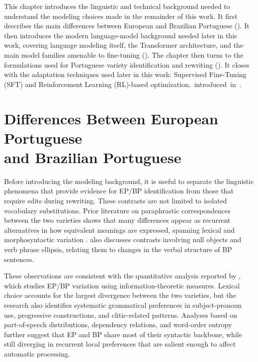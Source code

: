 \label{chap:back}

This chapter introduces the linguistic and technical background
needed to understand the modeling choices made in the remainder of this work.
It first describes the main differences between European and Brazilian
Portuguese (). It then introduces the modern
language-model background needed later in this work, covering language
modeling itself, the Transformer architecture, and the main model families
amenable to fine-tuning (). The chapter then turns to the formulations used for Portuguese variety
identification and rewriting (). It closes with the adaptation techniques used later in this work: Supervised
Fine-Tuning (SFT) and Reinforcement Learning (RL)-based \mbox{optimization, introduced in .}

\section[Differences Between European Portuguese and Brazilian Portuguese]{Differences Between European Portuguese\\and Brazilian Portuguese}
\label{sec:epbp-differences}

Before introducing the modeling background, it is useful to separate the
linguistic phenomena that provide evidence for EP/BP identification from those
that require edits during rewriting. These contrasts are not limited to isolated vocabulary
substitutions. Prior literature on paraphrastic correspondences between the two varieties
shows that many differences appear as recurrent alternatives in how equivalent
meanings are expressed, spanning lexical and morphosyntactic variation \citep{barreiro-mota-2018-paraphrastic}.
\citet{Cyrino_2001} also discusses contrasts involving null objects and verb phrase
ellipsis, relating them to changes in the verbal structure of BP sentences.

These observations are consistent with the quantitative analysis reported by
\citet{alves-2025-information}, which studies EP/BP variation using
information-theoretic measures. Lexical choice accounts for the largest
divergence between the two varieties, but the research also identifies systematic
grammatical preferences in subject-pronoun use, progressive constructions, and
clitic-related patterns. Analyses based on part-of-speech distributions,
dependency relations, and word-order entropy further suggest that EP and BP
share most of their syntactic backbone, while still diverging in recurrent
local preferences that are salient enough to affect automatic processing.

